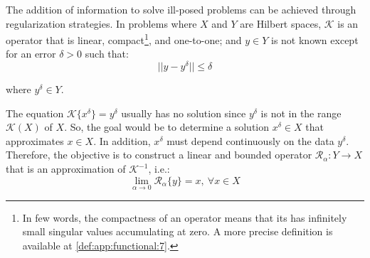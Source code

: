 		The addition of information to solve ill-posed problems can be achieved through regularization strategies. In problems where $X$ and $Y$ are Hilbert spaces, $\mathcal{K}$ is an operator that is linear, compact\footnote{In few words, the compactness of an operator means that its has infinitely small singular values accumulating at zero. A more precise definition is available at \autoref{def:app:functional:7}.}, and one-to-one; and $y\in Y$ is not known except for an error $\delta>0$ such that:
		\begin{equation}
			||y-y^\delta|| \le \delta \label{eq:2:inverse:1}
		\end{equation} 
	
		\noindent where $y^\delta\in Y$.
		
		The equation $\mathcal{K}\{x^\delta\}=y^\delta$ usually has no solution since $y^\delta$ is not in the range $\mathcal{K}(X)$ of $X$. So, the goal would be to determine a solution  $x^\delta\in X$ that approximates $x\in X$. In addition, $x^\delta$ must depend continuously on the data $y^\delta$. Therefore, the objective is to construct a linear and bounded operator $\mathcal{R}_\alpha : Y \rightarrow X$ that is an approximation of $\mathcal{K}^{-1}$, i.e.:
		\begin{equation}
			\lim\limits_{\alpha\rightarrow0} \mathcal{R}_\alpha\{y\} = x,~\forall x \in X \label{eq:2:inverse:2}
		\end{equation}
	
